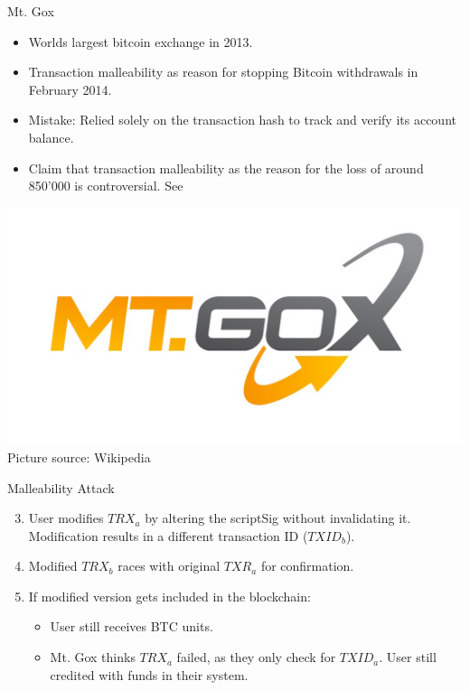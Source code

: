 \documentclass[handout]{beamer}
\begin{document}
\begin{frame}{Mt. Gox}
	\centering
		\begin{itemize}
			\item Worlds largest bitcoin exchange in 2013.
			\item Transaction malleability as reason for stopping Bitcoin withdrawals in February 2014.
			\item Mistake: Relied solely on the transaction hash to track and verify its account balance.
			\item Claim that transaction malleability as the reason for the loss of around 850'000 is controversial. See \cite{Decker2014}
		\end{itemize}
	\includegraphics[scale=0.12]{../assets/images/mt_gox}\\
	\footnotesize{Picture source: Wikipedia}	
\end{frame}


\begin{frame}{Malleability Attack}
	\centering
	\begin{tikzpicture}[squarednode/.style = {rectangle, draw=black!60, fill=black!5}]
		
	\end{tikzpicture}
	\begin{enumerate}
	\setcounter{enumi}{2}
		\item<3-> User modifies $TRX_{a}$ by altering the scriptSig without invalidating it. Modification results in a different transaction ID ($TXID_{b}$).
		\item<4-> Modified $TRX_{b}$ races with original $TXR_{a}$ for confirmation.
		\item<5-> If modified version gets included in the blockchain:
		\begin{itemize}
			\item User still receives BTC units.
			\item Mt. Gox thinks $TRX_{a}$ failed, as they only check for $TXID_{a}$. User still credited with funds in their system.
		\end{itemize}
	\end{enumerate}
\end{frame}
\end{document}
